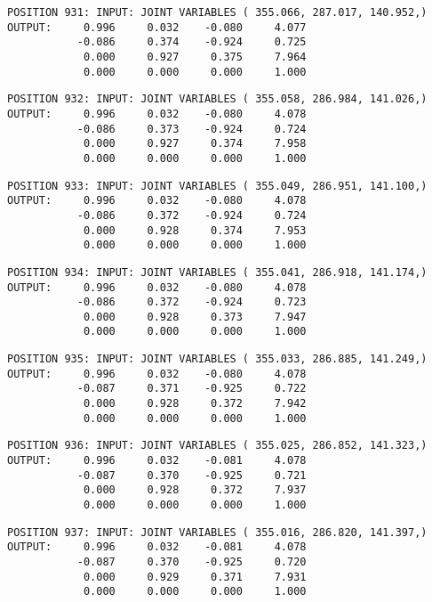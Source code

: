 \begin{verbatim}
POSITION 931: INPUT: JOINT VARIABLES ( 355.066, 287.017, 140.952,)
OUTPUT:     0.996     0.032    -0.080     4.077
           -0.086     0.374    -0.924     0.725
            0.000     0.927     0.375     7.964
            0.000     0.000     0.000     1.000
\end{verbatim} \pagebreak[1]\begin{verbatim}
POSITION 932: INPUT: JOINT VARIABLES ( 355.058, 286.984, 141.026,)
OUTPUT:     0.996     0.032    -0.080     4.078
           -0.086     0.373    -0.924     0.724
            0.000     0.927     0.374     7.958
            0.000     0.000     0.000     1.000
\end{verbatim} \pagebreak[1]\begin{verbatim}
POSITION 933: INPUT: JOINT VARIABLES ( 355.049, 286.951, 141.100,)
OUTPUT:     0.996     0.032    -0.080     4.078
           -0.086     0.372    -0.924     0.724
            0.000     0.928     0.374     7.953
            0.000     0.000     0.000     1.000
\end{verbatim} \pagebreak[1]\begin{verbatim}
POSITION 934: INPUT: JOINT VARIABLES ( 355.041, 286.918, 141.174,)
OUTPUT:     0.996     0.032    -0.080     4.078
           -0.086     0.372    -0.924     0.723
            0.000     0.928     0.373     7.947
            0.000     0.000     0.000     1.000
\end{verbatim} \pagebreak[1]\begin{verbatim}
POSITION 935: INPUT: JOINT VARIABLES ( 355.033, 286.885, 141.249,)
OUTPUT:     0.996     0.032    -0.080     4.078
           -0.087     0.371    -0.925     0.722
            0.000     0.928     0.372     7.942
            0.000     0.000     0.000     1.000
\end{verbatim} \pagebreak[1]\begin{verbatim}
POSITION 936: INPUT: JOINT VARIABLES ( 355.025, 286.852, 141.323,)
OUTPUT:     0.996     0.032    -0.081     4.078
           -0.087     0.370    -0.925     0.721
            0.000     0.928     0.372     7.937
            0.000     0.000     0.000     1.000
\end{verbatim} \pagebreak[1]\begin{verbatim}
POSITION 937: INPUT: JOINT VARIABLES ( 355.016, 286.820, 141.397,)
OUTPUT:     0.996     0.032    -0.081     4.078
           -0.087     0.370    -0.925     0.720
            0.000     0.929     0.371     7.931
            0.000     0.000     0.000     1.000
\end{verbatim} \pagebreak[1]\begin{verbatim}

\end{verbatim}
